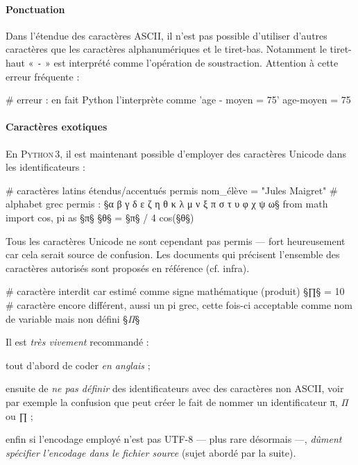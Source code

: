 \paragraph*{Ponctuation} 

Dans l'étendue des caractères ASCII, il n'est pas possible d'utiliser d'autres caractères que les caractères alphanumériques et le tiret-bas. Notamment le tiret-haut « \texttt{-} » est interprété com\-me l'opération de soustraction. Attention à cette erreur fréquente :

\begin{nbjupyterin}[before skip=4pt, after skip=6pt]{}
# erreur : en fait Python l'interprète comme 'age - moyen = 75'
age-moyen = 75  
\end{nbjupyterin}


\paragraph*{Caractères exotiques} 

En \textsc{Python\,3}, il est maintenant possible d'employer des caractères Unicode dans les identificateurs :

\begin{nbjupyterin}[before skip=4pt, after skip=6pt]{}
# caractères latins étendus/accentués permis
nom_élève = "Jules Maigret"
# alphabet grec permis : §α β γ δ ε ζ η θ κ λ μ ν ξ π σ τ υ φ χ ψ ω§
from math import cos, pi as §π§
§θ§ = §π§ / 4  
cos(§θ§)
\end{nbjupyterin}

Tous les caractères Unicode ne sont cependant pas permis --- fort heureusement car cela serait source de confusion. Les documents qui précisent l'ensemble des caractères autorisés sont proposés en référence (cf. infra).

\begin{nbjupyterin}[before skip=4pt, after skip=6pt]{}
# caractère interdit car estimé comme signe mathématique (produit)
§∏§ = 10
# caractère encore différent, aussi un pi grec, cette fois-ci acceptable comme nom de variable mais non défini
§\textit{Π}§
\end{nbjupyterin}

\begin{linewidthnote}
Il est \emph{très vivement} recommandé :
\begin{jazzitemize}
	\item tout d'abord de coder \emph{en anglais} ;
	\item ensuite de \emph{ne pas définir} des identificateurs avec des caractères non ASCII, voir par exemple la confusion que peut créer le fait de nommer un identificateur π, \textit{Π} ou ∏ ;
	\item enfin si l'encodage employé n'est pas \textsc{UTF-8} --- plus rare désormais ---, \emph{dûment spécifier l'encodage dans le fichier source} (sujet abordé par la suite).
\end{jazzitemize}
\end{linewidthnote}

